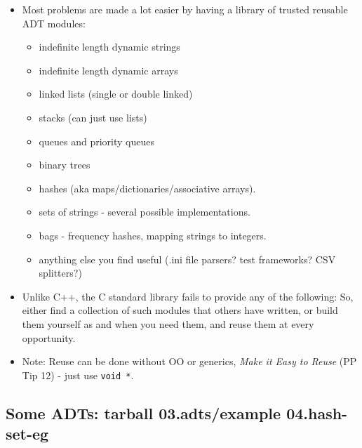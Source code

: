 \documentclass[aspectratio=169]{beamer}
\newcommand{\pitem}{\pause \item}
\begin{document}
\begin{frame}[fragile]
    \begin{itemize}
    \item
      Most problems are made a lot easier by having a library
      of trusted reusable ADT modules:
      \begin{itemize}
      \item
      indefinite length \alert{dynamic strings}
      \item
      indefinite length \alert{dynamic arrays}
      \pause
      \item
      \alert{linked lists} (single or double linked)
      \item
      \alert{stacks} (can just use lists)
      \item
      \alert{queues} and \alert{priority queues}
      \item
      \alert{binary trees}
      \pause
      \item
      \alert{hashes} (aka maps/dictionaries/associative arrays).
      \item
      \alert{sets} of strings - several possible implementations.
      \item
      \alert{bags} - frequency hashes, mapping strings to integers.
      \pause
      \item
      anything else you find useful (.ini file parsers? test frameworks?
      CSV splitters?)
      \end{itemize}
    \pitem
      Unlike C++, the C standard library fails to provide any of the following:
      So, either find a collection of such modules that others have
      written, or \alert{build them yourself} as and when you need them, and
      \alert{reuse them} at every opportunity.
    \pitem
      Note: Reuse can be done without OO or generics,
      {\em Make it Easy to Reuse} (PP Tip 12) - just use \verb+void *+.
    \end{itemize}
\end{frame}

\subsection{Some ADTs: tarball 03.adts/example 04.hash-set-eg}
\end{document}
